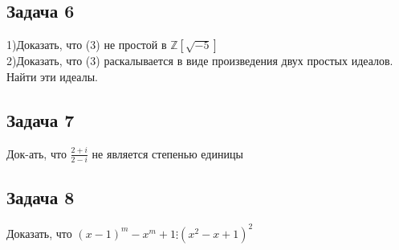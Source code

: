 \documentclass{article}
\begin{document}
\subsection*{Задача 6}
1)Доказать, что (3) не простой в $\mathbb{Z}[\sqrt{-5}]$\\
2)Доказать, что (3) раскалывается в виде произведения двух простых идеалов. Найти эти идеалы.
\subsection*{Задача 7}
Док-ать, что $\frac{2+i}{2-i}$ не является степенью единицы
\subsection*{Задача 8}
Доказать, что $(x-1)^m-x^m+1 \vdots (x^2-x+1)^2$
\end{document}

